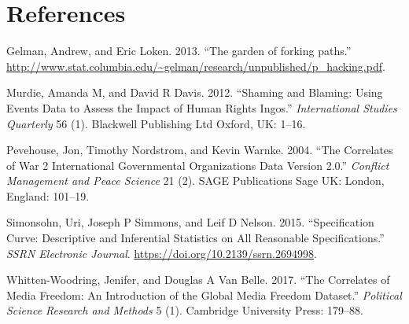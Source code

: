 \documentclass[]{article}
\begin{document}
\hypertarget{references}{%
\section*{References}\label{references}}

\hypertarget{refs}{}
\leavevmode\hypertarget{ref-gelman2013garden}{}%
Gelman, Andrew, and Eric Loken. 2013. ``The garden of forking paths.''
\url{http://www.stat.columbia.edu/~gelman/research/unpublished/p_hacking.pdf}.

\leavevmode\hypertarget{ref-murdie2012shaming}{}%
Murdie, Amanda M, and David R Davis. 2012. ``Shaming and Blaming: Using
Events Data to Assess the Impact of Human Rights Ingos.''
\emph{International Studies Quarterly} 56 (1). Blackwell Publishing Ltd
Oxford, UK: 1--16.

\leavevmode\hypertarget{ref-pevehouse2004correlates}{}%
Pevehouse, Jon, Timothy Nordstrom, and Kevin Warnke. 2004. ``The
Correlates of War 2 International Governmental Organizations Data
Version 2.0.'' \emph{Conflict Management and Peace Science} 21 (2). SAGE
Publications Sage UK: London, England: 101--19.

\leavevmode\hypertarget{ref-simonsohn2015specification}{}%
Simonsohn, Uri, Joseph P Simmons, and Leif D Nelson. 2015.
``Specification Curve: Descriptive and Inferential Statistics on All
Reasonable Specifications.'' \emph{SSRN Electronic Journal}.
\url{https://doi.org/10.2139/ssrn.2694998}.

\leavevmode\hypertarget{ref-whitten2017correlates}{}%
Whitten-Woodring, Jenifer, and Douglas A Van Belle. 2017. ``The
Correlates of Media Freedom: An Introduction of the Global Media Freedom
Dataset.'' \emph{Political Science Research and Methods} 5 (1).
Cambridge University Press: 179--88.
\end{document}
